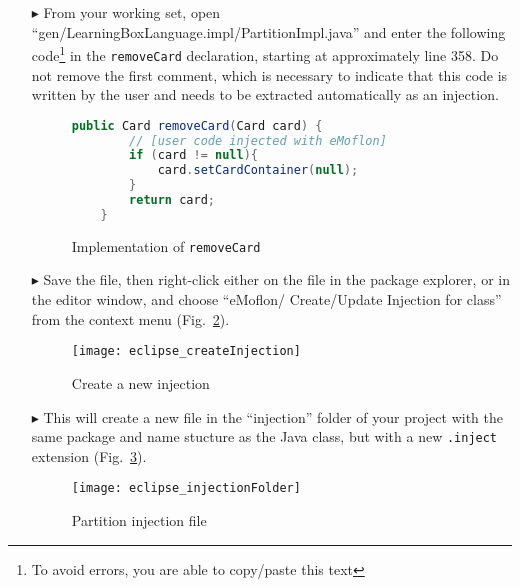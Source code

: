 \begin{itemize}

\item[$\blacktriangleright$] From your working set, open ``gen/LearningBoxLanguage.impl/Part\-it\-ionImpl.java'' and enter the following code\footnote{To avoid
errors, you are able to copy/paste this text} in the \texttt{removeCard} declaration, starting at approximately line 358. Do not remove the first comment,
which is necessary to indicate that this code is written by the user and needs to be extracted automatically as an injection.

\vspace{0.5cm}

\begin{figure}[htbp]
        \centering
        \begin{lstlisting}[language=Java, keywordstyle={\bfseries\color{purple}}, backgroundcolor=\color{white}]
    public Card removeCard(Card card) {
        // [user code injected with eMoflon]
        if (card != null){
        	card.setCardContainer(null);
        }
        return card;
    }
        \end{lstlisting}
        \caption{Implementation of \texttt{removeCard}}
        \label{fig:addToStringRep_impl}
\end{figure}

\vspace{0.5cm}

\item[$\blacktriangleright$] Save the file, then right-click either on the file in the package explorer, or in the editor window, and choose ``eMoflon/
Create/Update Injection for class'' from the context menu (Fig.~\ref{fig:injection_create_injection}).

\begin{figure}[htbp]
    \centering
    \texttt{[image: eclipse\_createInjection]}
    \caption{Create a new injection}
    \label{fig:injection_create_injection}
\end{figure}

\item[$\blacktriangleright$] This will create a new file in the ``injection'' folder of your project with the same package and name stucture as the Java class,
but with a new \texttt{.inject} extension (Fig.~\ref{fig:injection_folder}).

\begin{figure}[htbp]
    \centering
    \texttt{[image: eclipse\_injectionFolder]}
    \caption{Partition injection file}
    \label{fig:injection_folder}
\end{figure}


\end{itemize}
